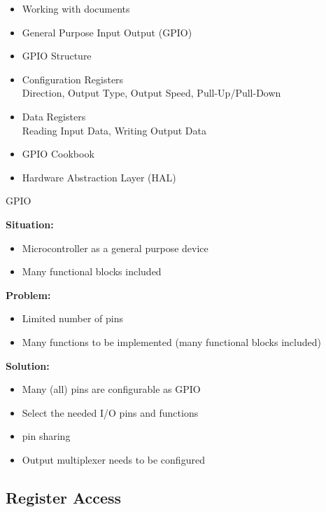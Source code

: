 \begin{remark}
    \begin{itemize}
        \item Working with documents
        \item General Purpose Input Output (GPIO)
        \item GPIO Structure
        \item Configuration Registers\\
        Direction, Output Type, Output Speed, Pull-Up/Pull-Down
        \item Data Registers\\
        Reading Input Data, Writing Output Data
        \item GPIO Cookbook
        \item Hardware Abstraction Layer (HAL)
    \end{itemize}
\end{remark}

\begin{definition}{GPIO}

    \textbf{Situation:}
    \begin{itemize}
        \item Microcontroller as a general purpose device
        \item Many functional blocks included
    \end{itemize}

    \textbf{Problem:}
    \begin{itemize}
        \item Limited number of pins
        \item Many functions to be implemented (many functional blocks included)
    \end{itemize}

    \textbf{Solution:}
    \begin{itemize}
        \item Many (all) pins are configurable as GPIO
        \item Select the needed I/O pins and functions
        \item \oq pin sharing\cq
        \item Output multiplexer needs to be configured
    \end{itemize}
\end{definition}

\subsection{Register Access}


